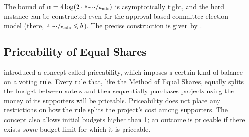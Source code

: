 \documentclass[10pt]{scrartcl}
\renewcommand*{\leq}{\leqslant}
\theoremstyle{definition}
\theoremstyle{plain}
\begin{document}
The bound of $\alpha = 4\log(2\cdot \nicefrac{u_{\max}}{u_{\min}})$ is asymptotically tight, and the hard instance can be constructed even for the approval-based committee-election model (there, $\nicefrac{u_{\max}}{u_{\min}} \leq b$). The precise construction is given by \citet{pet-sko:laminar}.

\subsection{Priceability of Equal Shares}\label{sec:priceability}

\citet{pet-sko:laminar} introduced a concept called priceability, which imposes a certain kind of balance on a voting rule. Every rule that, like the Method of Equal Shares, equally splits the budget between voters and then sequentially purchases projects using the money of its supporters will be priceable. Priceability does not place any restrictions on how the rule splits the project's cost among supporters. The concept also allows initial budgets higher than 1; an outcome is priceable if there exists \emph{some} budget limit for which it is priceable.
\end{document}
